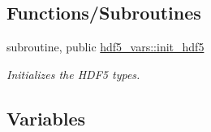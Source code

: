 \subsection*{Functions/\+Subroutines}
\begin{DoxyCompactItemize}
\item 
subroutine, public \hyperlink{namespacehdf5__vars_ab644703bcb67ce423732e39ab56a4b63}{hdf5\+\_\+vars\+::init\+\_\+hdf5}
\begin{DoxyCompactList}\small\item\em Initializes the H\+D\+F5 types. \end{DoxyCompactList}\end{DoxyCompactItemize}
\subsection*{Variables}
